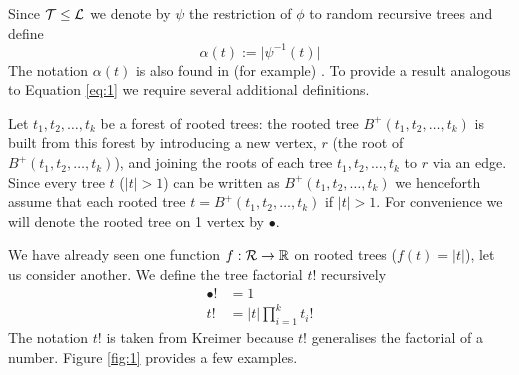 Since $\operatorname{\mathcal{T}} \leq \operatorname{\mathcal{L}}$ we denote by $\psi$ the restriction of $\phi$ to random recursive trees and define
\[
 \alpha(t) := \lvert \psi^{-1}(t) \rvert 
\]
The notation $\alpha(t)$ is also found in (for example) \cite{brouder,butcher1963,mazza}.  To provide a result analogous to Equation \ref{eq:1} we require several additional definitions. 

Let $t_1,t_2,\dots,t_k$ be a forest of rooted trees: the rooted tree $B^{+}(t_1,t_2,\dots,t_k)$ is built from this forest by 
introducing a new vertex, $r$ (the root of $B^{+}(t_1,t_2,\dots,t_k)$), and joining the roots of each tree $t_1,t_2,\dots,t_k$ 
to $r$ via an edge.  Since every tree $t$ ($\lvert t \rvert >1$) can be written as $B^{+}(t_1,t_2,\dots,t_k)$ we henceforth 
assume that each rooted tree $t = B^{+}(t_1,t_2,\dots,t_k)$ if $\lvert t \rvert >1$.  For convenience we will denote the rooted tree on 1 vertex 
by $\bullet$.


We have already seen one function $f: \operatorname{\mathcal{R}} \rightarrow \mathbb{R}$ on rooted trees ($f(t) = \lvert t \rvert$), let us consider 
another. We define the tree factorial $t!$ recursively
\begin{align}
 \bullet! &=  1  \\
 t ! &= \lvert t \rvert \prod_{i=1}^k t_i !
\end{align}
The notation $t!$ is taken from Kreimer \cite{kreimer} because $t!$ generalises the factorial of a number.  Figure \ref{fig:1} 
provides a few examples.

